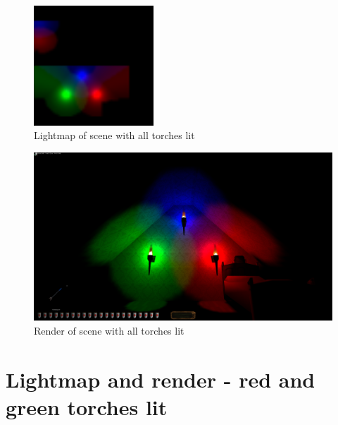 \begin{appendix}
\begin{figure}[htbp]
	\centering
		\includegraphics[width=0.40\textwidth]{img/PIX/rgb.png}
	\caption[Lightmap of scene with all torches lit]{Lightmap of scene with all torches lit}
	\label{fig:LightmapRGB}
\end{figure}
\begin{figure}[htbp]
	\centering
		\includegraphics[width=1.00\textwidth]{img/PIX/render_rgb.png}
	\caption[Render of scene with all torches lit]{Render of scene with all torches lit}
	\label{fig:RenderRGB}
\end{figure}

\clearpage
{}
\section{Lightmap and render - red and green torches lit} 



\end{appendix}
